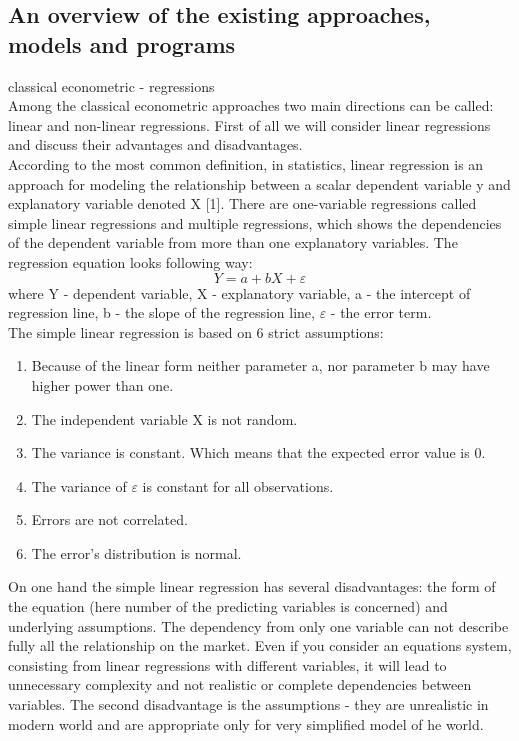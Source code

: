 \documentclass[12pt, a4paper]{article}
\begin{document}
\subsection{An overview of the existing approaches, models and programs}
classical econometric - regressions\\
Among the classical econometric approaches two main directions can be called: linear and non-linear regressions. First of all we will consider linear regressions and discuss their advantages and disadvantages.\\
According to the most common definition, in statistics, linear regression is an approach for modeling the relationship between a scalar dependent variable y and explanatory variable denoted X [1]. There are one-variable regressions called simple linear regressions and multiple regressions, which shows the dependencies of the dependent variable from more than one explanatory variables. The regression equation looks following way:\\
\[Y = a + bX + \varepsilon\]
where Y - dependent variable, X - explanatory variable, a - the intercept of regression line, b - the slope of the regression line, $\varepsilon$ - the error term.\\
The simple linear regression is based on 6 strict assumptions:
\begin{enumerate}
	\item Because of the linear form neither parameter a, nor parameter b may have higher power than one.
	\item The independent variable X is not random.
	\item The variance is constant. Which means that the expected error value is 0.
	\item The variance of $\varepsilon$ is constant for all observations.
	\item Errors are not correlated.
	\item The error's distribution is normal.
\end{enumerate}
On one hand the simple linear regression has several disadvantages: the form of the equation (here number of the predicting variables is concerned) and underlying assumptions. The dependency from only one variable can not describe fully all the relationship on the market. Even if you consider an equations system, consisting from linear regressions with different variables, it will lead to unnecessary complexity and not realistic or complete dependencies between variables. The second disadvantage is the assumptions - they are unrealistic in modern world and are appropriate only for very simplified model of he world.\\
\end{document}
